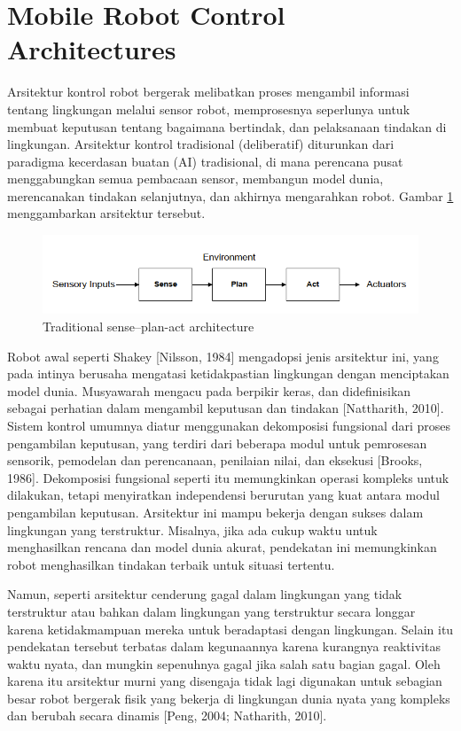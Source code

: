 \section{Mobile Robot Control Architectures}
Arsitektur kontrol robot bergerak melibatkan proses mengambil informasi tentang lingkungan melalui sensor robot, memprosesnya seperlunya untuk membuat
keputusan tentang bagaimana bertindak, dan pelaksanaan tindakan di lingkungan. Arsitektur kontrol tradisional (deliberatif) diturunkan dari paradigma kecerdasan buatan (AI) tradisional, di mana perencana pusat menggabungkan semua pembacaan sensor, membangun model dunia, merencanakan tindakan selanjutnya, dan akhirnya mengarahkan robot. Gambar \ref{fig:screenshot005} menggambarkan arsitektur tersebut. 
\begin{figure}[H]
	\centering
	\includegraphics[width=0.7\linewidth]{figure/screenshot005}
	\caption[]{Traditional sense–plan-act architecture}
	\label{fig:screenshot005}
\end{figure}

Robot awal seperti Shakey [Nilsson, 1984] mengadopsi jenis arsitektur ini, yang pada intinya berusaha mengatasi ketidakpastian lingkungan dengan menciptakan model dunia.
Musyawarah mengacu pada berpikir keras, dan didefinisikan sebagai perhatian dalam mengambil keputusan dan tindakan [Nattharith, 2010]. Sistem kontrol umumnya diatur menggunakan dekomposisi fungsional dari proses pengambilan keputusan, yang terdiri dari beberapa modul untuk pemrosesan sensorik, pemodelan dan perencanaan, penilaian nilai, dan eksekusi [Brooks, 1986]. Dekomposisi fungsional seperti itu memungkinkan operasi kompleks untuk dilakukan, tetapi menyiratkan independensi berurutan yang kuat antara modul pengambilan keputusan. Arsitektur ini mampu bekerja dengan sukses dalam lingkungan yang terstruktur. Misalnya, jika ada cukup waktu untuk menghasilkan rencana dan model dunia akurat, pendekatan ini memungkinkan robot menghasilkan tindakan terbaik untuk situasi tertentu. 

Namun, seperti arsitektur cenderung gagal dalam lingkungan yang tidak terstruktur atau bahkan dalam lingkungan yang terstruktur secara longgar karena ketidakmampuan mereka untuk beradaptasi dengan lingkungan. Selain itu pendekatan tersebut terbatas dalam kegunaannya karena kurangnya reaktivitas waktu nyata, dan mungkin sepenuhnya gagal jika salah satu bagian gagal. Oleh karena itu arsitektur murni yang disengaja tidak lagi digunakan untuk sebagian besar robot bergerak fisik yang bekerja di lingkungan dunia nyata yang kompleks dan berubah secara dinamis [Peng, 2004; Natharith, 2010].


